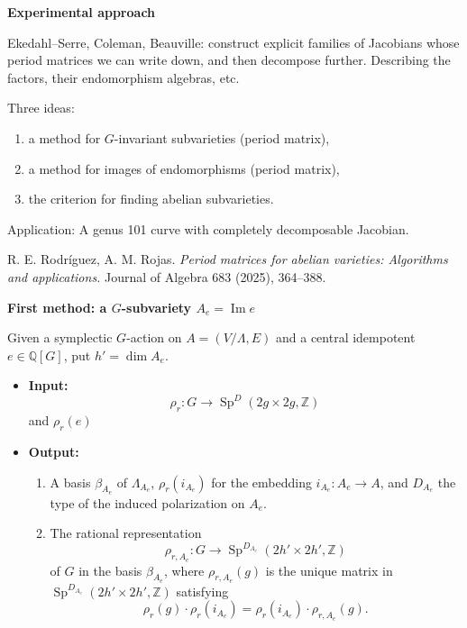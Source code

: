 \medskip\noindent
{\bf Experimental approach}

Ekedahl--Serre, Coleman, Beauville:
construct explicit families of Jacobians
whose period matrices we can write down,
and then decompose further. Describing the
factors, their endomorphism algebras, etc.

Three ideas:
\begin{enumerate}
\item a method for $G$-invariant
subvarieties (period matrix),

\item a method for images of endomorphisms
(period matrix),

\item the criterion for finding abelian
subvarieties.
\end{enumerate}

Application: A genus 101 curve with
completely decomposable Jacobian.

R. E. Rodr\'iguez, A. M. Rojas.
{\it Period matrices for abelian
varieties: Algorithms and applications.}
Journal of Algebra 683 (2025), 364--388.

\medskip\noindent
{\bf First method: a $G$-subvariety
$A_e=\operatorname{Im}e$}

Given a symplectic $G$-action on
$A=(V/\Lambda,E)$ and a central
idempotent $e\in\mathbb{Q}[G]$, put
$h'=\dim A_e$.

\begin{itemize}
\item {\bf Input:}
$$
\rho_r\colon
G\longrightarrow
\operatorname{Sp}^D
(2g\times 2g,\mathbb{Z})
$$
and $\rho_r(e)$

\item {\bf Output:}
\begin{enumerate}
\item A basis $\beta_{A_e}$ of
$\Lambda_{A_e}$,
$\rho_r(i_{A_e})$ for the embedding
$i_{A_e}\colon A_e\to A$, and
$D_{A_e}$ the type of the induced
polarization on $A_e$.

\item The rational representation
$$
\rho_{r,A_e}\colon
G\longrightarrow
\operatorname{Sp}^{D_{A_e}}
(2h'\times 2h',\mathbb{Z})
$$
of $G$ in the basis $\beta_{A_e}$, where
$\rho_{r,A_e}(g)$ is the unique matrix in
$\operatorname{Sp}^{D_{A_e}}
(2h'\times 2h',\mathbb{Z})$ satisfying
\begin{equation}
\label{equation-restricted-representation}
\rho_r(g)\cdot\rho_r(i_{A_e})
=
\rho_r(i_{A_e})\cdot\rho_{r,A_e}(g).
\tag{1}
\end{equation}
\end{enumerate}
\end{itemize}

